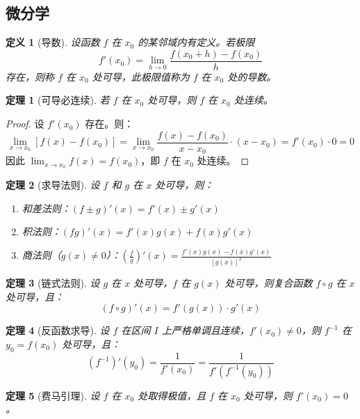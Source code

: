 \documentclass[12pt]{article}
\newtheorem{theorem}{定理}[section]
\newtheorem{definition}{定义}[section]
\begin{document}
\subsection{微分学}

\begin{definition}[导数]
设函数 $f$ 在 $x_0$ 的某邻域内有定义。若极限
$$f'(x_0) = \lim_{h \to 0} \frac{f(x_0 + h) - f(x_0)}{h}$$
存在，则称 $f$ 在 $x_0$ 处可导，此极限值称为 $f$ 在 $x_0$ 处的导数。
\end{definition}

\begin{theorem}[可导必连续]
若 $f$ 在 $x_0$ 处可导，则 $f$ 在 $x_0$ 处连续。
\end{theorem}

\begin{proof}
设 $f'(x_0)$ 存在。则：
$$\lim_{x \to x_0} [f(x) - f(x_0)] = \lim_{x \to x_0} \frac{f(x) - f(x_0)}{x - x_0} \cdot (x - x_0) = f'(x_0) \cdot 0 = 0$$
因此 $\lim_{x \to x_0} f(x) = f(x_0)$，即 $f$ 在 $x_0$ 处连续。
\end{proof}

\begin{theorem}[求导法则]
设 $f$ 和 $g$ 在 $x$ 处可导，则：
\begin{enumerate}
\item 和差法则：$(f \pm g)'(x) = f'(x) \pm g'(x)$
\item 积法则：$(fg)'(x) = f'(x)g(x) + f(x)g'(x)$
\item 商法则（$g(x) \neq 0$）：$\left(\frac{f}{g}\right)'(x) = \frac{f'(x)g(x) - f(x)g'(x)}{[g(x)]^2}$
\end{enumerate}
\end{theorem}

\begin{theorem}[链式法则]
设 $g$ 在 $x$ 处可导，$f$ 在 $g(x)$ 处可导，则复合函数 $f \circ g$ 在 $x$ 处可导，且：
$$(f \circ g)'(x) = f'(g(x)) \cdot g'(x)$$
\end{theorem}

\begin{theorem}[反函数求导]
设 $f$ 在区间 $I$ 上严格单调且连续，$f'(x_0) \neq 0$，则 $f^{-1}$ 在 $y_0 = f(x_0)$ 处可导，且：
$$(f^{-1})'(y_0) = \frac{1}{f'(x_0)} = \frac{1}{f'(f^{-1}(y_0))}$$
\end{theorem}

\begin{theorem}[费马引理]
设 $f$ 在 $x_0$ 处取得极值，且 $f$ 在 $x_0$ 处可导，则 $f'(x_0) = 0$。
\end{theorem}
\end{document}
